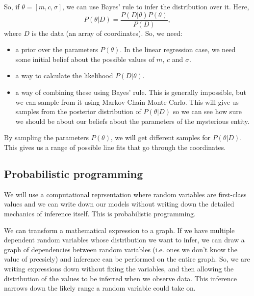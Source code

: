 \documentclass[a4paper, openany]{memoir}
\begin{document}
So, if $\theta = [m, c, \sigma]$, we can use Bayes' rule to infer the distribution over it. Here,
\[P(\theta|D) = \frac{P(D|\theta) P(\theta)}{P(D)},\]
where $D$ is the data (an array of coordinates). So, we need:
\begin{itemize}
    \item a prior over the parameters $P(\theta)$. In the linear regression case, we need some initial belief about the possible values of $m$, $c$ and $\sigma$.
    \item a way to calculate the likelihood $P(D|\theta)$.
    \item a way of combining these using Bayes' rule. This is generally impossible, but we can sample from it using Markov Chain Monte Carlo. This will give us samples from the posterior distribution of $P(\theta|D)$ so we can see how sure we should be about our beliefs about the parameters of the mysterious entity.
\end{itemize}
By sampling the parameters $P(\theta)$, we will get different samples for $P(\theta|D)$. This gives us a range of possible line fits that go through the coordinates.

\subsection{Probabilistic programming}
We will use a computational reprsentation where random variables are first-class values and we can write down our models without writing down the detailed mechanics of inference itself. This is probabilistic programming.

We can transform a mathematical expression to a graph. If we have multiple dependent random variables whose distribution we want to infer, we can draw a graph of dependencies between random variables (i.e. ones we don't know the value of precsiely) and inference can be performed on the entire graph. So, we are writing expressions down without fixing the variables, and then allowing the distribution of the values to be inferred when we observe data. This inference narrows down the likely range a random variable could take on.
\end{document}
